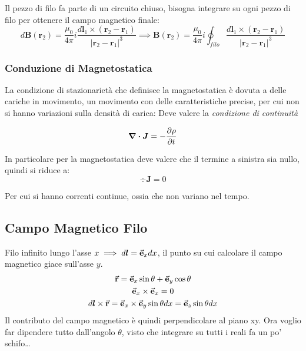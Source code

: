 \documentclass[a4paper]{scrarticle}
\begin{document}
Il pezzo di filo fa parte di un circuito chiuso, bisogna integrare su ogni pezzo di filo per ottenere il campo magnetico finale:
\begin{equation}
    d \bm B(\bm r_2) = \frac{\mu_0}{4\pi} i \frac{d \bm l_1 \times (\bm r_2 -\bm r_1)}{\left|\bm r_2 - \bm r_1\right|^3}
    \implies \bm B (\bm r_2) = \frac{\mu_0}{4 \pi}i \oint_{filo} \frac{d \bm l_1 \times (\bm r_2 -\bm r_1)}{\left|\bm r_2 - \bm r_1\right|^3}
\end{equation}

\subsubsection*{Conduzione di Magnetostatica}

La condizione di stazionarietà che definisce la magnetostatica è dovuta a delle cariche in movimento, un movimento con delle caratteristiche precise, per cui non si hanno variazioni sulla densità di carica: Deve valere la \emph{condizione di continuità}

\begin{equation}
    \div \bm J = - \pdv{\rho}{t}
\end{equation}

In particolare per la magnetostatica deve valere che il termine a sinistra sia nullo, quindi si riduce a:
\begin{equation}
    \div \bm J = 0
\end{equation}

Per cui si hanno correnti continue, ossia che non variano nel tempo.

\subsection{Campo Magnetico Filo}

Filo infinito lungo l'asse $x\implies d \bm l = \va e_x dx$, il punto su cui calcolare il campo magnetico giace sull'asse $y$.
\begin{gather*}
    \va r = \va e_x \sin \theta + \va e_y \cos \theta\\
    \va e_x \times \va e_x = 0\\
    d \bm l \times \va r = \va e_x \times \va e_y \sin \theta dx = \va e_z \sin \theta dx
\end{gather*}
Il contributo del campo magnetico è quindi perpendicolare al piano xy. Ora voglio far dipendere tutto dall'angolo $\theta$, visto che integrare su tutti i reali fa un po' schifo\dots
\end{document}
